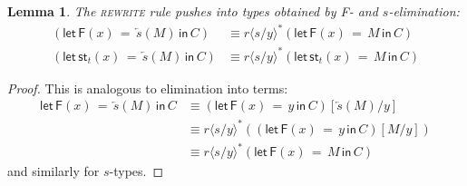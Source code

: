 \documentclass[10pt]{article}
\newtheorem{lemma}{Lemma}
\theoremstyle{definition}
\newcommand{\rewrite}[2]{\overleftarrow{#1}(#2)}
\newcommand\St[2]{\ensuremath{{#1}^*(#2)}}
\newcommand\StI[2]{\ensuremath{\mathsf{st}_{#1}(#2)}}
\newcommand\StE[4]{\ensuremath{\mathsf{let} \, \StI{#1}{#3} \, = \, {#2} \, \mathsf{in} \, #4}}
\newcommand\FE[3]{\ensuremath{\mathsf{let} \, \mathsf{F}(#2) \, = \, {#1} \, \mathsf{in} \, #3}}
\newcommand\ap[2]{\ensuremath{#1 \langle #2 \rangle }}
\begin{document}
\begin{lemma}
The \textsc{rewrite} rule pushes into types obtained by \textsf{F}- and $s$-elimination:
\begin{align*}
(\FE{\rewrite{s}{M}}{x}{C}) &\equiv \St{\ap{r}{s/y}}{\FE{M}{x}{C}} \\
(\StE{t}{\rewrite{s}{M}}{x}{C}) &\equiv \St{\ap{r}{s/y}}{\StE{t}{M}{x}{C}}
\end{align*}
\end{lemma}
\begin{proof}
This is analogous to elimination into terms:
\begin{align*}
\FE{\rewrite{s}{M}}{x}{C}
&\equiv (\FE{y}{x}{C})[\rewrite{s}{M}/y] \\
&\equiv \St{\ap{r}{s/y}}{(\FE{y}{x}{C})[M/y]} \\
&\equiv \St{\ap{r}{s/y}}{\FE{M}{x}{C}}
\end{align*}
and similarly for $s$-types.
\end{proof}
\end{document}
